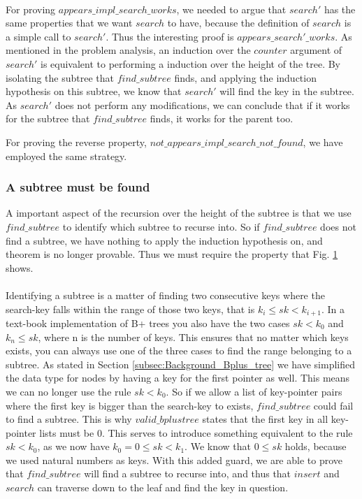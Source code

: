 \paragraph{}
For proving $appears\_impl\_search\_works$, we needed to argue that $search'$ has the same properties that we want $search$ to have, because the definition of $search$ is a simple call to $search'$. Thus the interesting proof is $appears\_search'\_works$. As mentioned in the problem analysis, an induction over the $counter$ argument of $search'$ is equivalent to performing a induction over the height of the tree. By isolating the subtree that $find\_subtree$ finds, and applying the induction hypothesis on this subtree, we know that $search'$ will find the key in the subtree. As $search'$ does not perform any modifications, we can conclude that if it works for the subtree that $find\_subtree$ finds, it works for the parent too. 

For proving the reverse property, $not\_appears\_impl\_search\_not\_found$, we have employed the same strategy.

\subsubsection{A subtree must be found}
A important aspect of the recursion over the height of the subtree is that we use $find\_subtree$ to identify which subtree to recurse into. So if $find\_subtree$ does not find a subtree, we have nothing to apply the induction hypothesis on, and theorem is no longer provable. Thus we must require the property that Fig. \ref{fig:find_must_find} shows.

\begin{figure}
  
  \label{fig:find_must_find}
\end{figure}

\paragraph{}
Identifying a subtree is a matter of finding two consecutive keys where the search-key falls within the range of those two keys, that is $k_i \le sk < k_{i+1}$. In a text-book implementation of B+ trees you also have the two cases $sk < k_0$ and $k_{n} \le sk$, where n is the number of keys. This ensures that no matter which keys exists, you can always use one of the three cases to find the range belonging to a subtree. As stated in Section \ref{subsec:Background_Bplus_tree} we have simplified the data type for nodes by having a key for the first pointer as well. This means we can no longer use the rule $sk < k_0$. So if we allow a list of key-pointer pairs where the first key is bigger than the search-key to exists, $find\_subtree$ could fail to find a subtree. This is why $valid\_bplustree$ states that the first key in all key-pointer lists must be 0. This serves to introduce something equivalent to the rule $sk < k_0$, as we now have $k_0 = 0 \le sk < k_1$. We know that $0 \le sk$ holds, because we used natural numbers as keys. With this added guard, we are able to prove that $find\_subtree$ will find a subtree to recurse into, and thus that $insert$ and $search$ can traverse down to the leaf and find the key in question.

